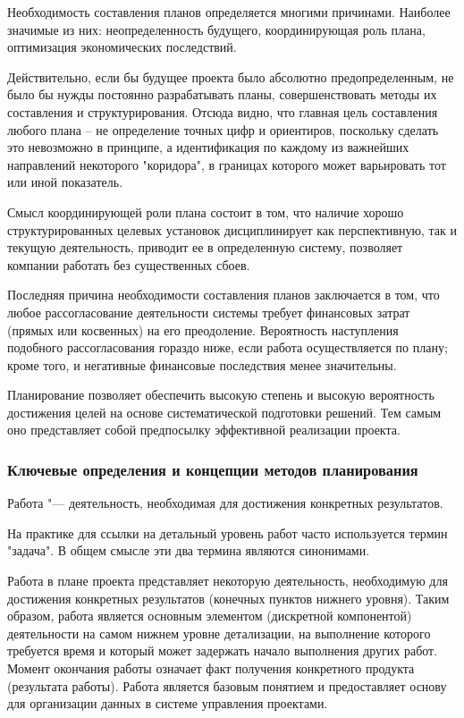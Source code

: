 \documentclass{../industrial-development}
\begin{document}
Необходимость составления планов определяется многими причинами. Наиболее значимые из них: неопределенность будущего, координирующая роль плана, оптимизация экономических последствий.

Действительно, если бы будущее проекта было абсолютно предопределенным, не было бы нужды постоянно разрабатывать планы, совершенствовать методы их составления и структурирования. Отсюда видно, что главная цель составления любого плана – не определение точных цифр и ориентиров, поскольку сделать это невозможно в принципе, а идентификация по каждому из важнейших направлений некоторого "коридора", в границах которого может варьировать тот или иной показатель.

Смысл координирующей роли плана состоит в том, что наличие хорошо структурированных целевых установок дисциплинирует как перспективную, так и текущую деятельность, приводит ее в определенную систему, позволяет компании работать без существенных сбоев.

Последняя причина необходимости составления планов заключается в том, что любое рассогласование деятельности системы требует финансовых затрат (прямых или косвенных) на его преодоление. Вероятность наступления подобного рассогласования гораздо ниже, если работа осуществляется по плану; кроме того, и негативные финансовые последствия менее значительны.

Планирование позволяет обеспечить высокую степень и высокую вероятность достижения целей на основе систематической подготовки решений. Тем самым оно представляет собой предпосылку эффективной реализации проекта.

    \begin{frame} \frametitle{Ключевые определения и концепции методов планирования}
        \begin{definition}
           Работа "--- деятельность, необходимая для достижения конкретных результатов.
        \end{definition}
На практике для ссылки на детальный уровень работ часто используется термин "задача". В общем смысле эти два термина являются синонимами.
    \end{frame}
    \lecturenotes

Работа в плане проекта представляет некоторую деятельность, необходимую для достижения конкретных результатов (конечных пунктов нижнего уровня). Таким образом, работа является основным элементом (дискретной компонентой) деятельности на самом нижнем уровне детализации, на выполнение которого требуется время и который может задержать начало выполнения других работ. Момент окончания работы означает факт получения конкретного продукта (результата работы). Работа является базовым понятием и предоставляет основу для организации данных в системе управления проектами.
\end{document}
